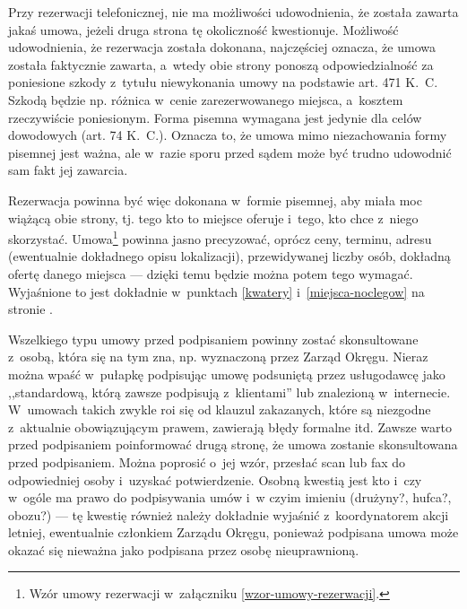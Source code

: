\documentclass[a5paper,10pt,titlepage,twoside]{article}
\begin{document}
Przy rezerwacji telefonicznej, nie ma możliwości udowodnienia, że została zawarta jakaś umowa, jeżeli druga strona tę okoliczność kwestionuje. Możliwość udowodnienia, że rezerwacja została dokonana, najczęściej oznacza, że umowa została faktycznie zawarta, a~wtedy obie strony ponoszą
odpowiedzialność za poniesione szkody z~tytułu niewykonania umowy na podstawie art. 471 K.~C. Szkodą będzie np. różnica w~cenie zarezerwowanego miejsca, a~kosztem rzeczywiście poniesionym. Forma pisemna wymagana jest jedynie dla celów dowodowych (art. 74 K.~C.). Oznacza to, że umowa mimo niezachowania formy pisemnej jest ważna, ale w~razie sporu przed sądem może być trudno udowodnić sam fakt jej zawarcia.

Rezerwacja powinna być więc dokonana w~formie pisemnej, aby miała moc wiążącą obie strony, tj. tego kto to miejsce oferuje i~tego, kto chce z~niego skorzystać. Umowa\footnote{Wzór umowy rezerwacji w~załączniku \ref{wzor-umowy-rezerwacji}.} powinna jasno precyzować, oprócz ceny, terminu, adresu (ewentualnie dokładnego opisu lokalizacji), przewidywanej liczby osób, dokładną ofertę danego miejsca --- dzięki temu będzie można potem tego wymagać. Wyjaśnione to jest dokładnie w~punktach \ref{kwatery} i~\ref{miejsca-noclegow} na stronie \pageref{kwatery}.

Wszelkiego typu umowy przed podpisaniem powinny zostać skonsultowane z~osobą, która się na tym zna, np.  wyznaczoną przez Zarząd Okręgu. Nieraz można wpaść w~pułapkę podpisując umowę podsuniętą przez usługodawcę jako ,,standardową, którą zawsze podpisują z~klientami'' lub znalezioną w~internecie. W~umowach takich zwykle roi się od klauzul zakazanych, które są niezgodne z~aktualnie obowiązującym prawem, zawierają błędy formalne itd. Zawsze warto przed podpisaniem poinformować drugą stronę, że umowa zostanie skonsultowana przed podpisaniem. Można poprosić o~jej wzór, przesłać scan lub fax do odpowiedniej osoby i~uzyskać potwierdzenie. Osobną kwestią jest kto i~czy w~ogóle ma prawo do podpisywania umów i~w czyim imieniu (drużyny?, hufca?, obozu?) --- tę kwestię również należy dokładnie wyjaśnić z~koordynatorem akcji letniej, ewentualnie członkiem Zarządu Okręgu, ponieważ podpisana umowa może okazać się nieważna jako podpisana przez osobę nieuprawnioną.
\end{document}
